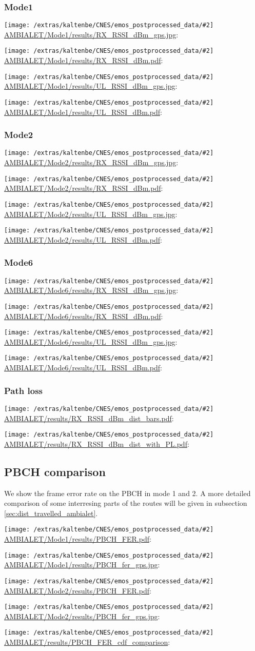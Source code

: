 \documentclass[a4paper,10pt]{article}
\newcommand{\printfile}[2][]{
 \begin{minipage}{8cm}
  \centering
  \texttt{[image: /extras/kaltenbe/CNES/emos\_postprocessed\_data/\#2]}
  \url{#2}: #1

 \end{minipage}
}
\begin{document}
\subsubsection{Mode1}
\printfile{AMBIALET/Mode1/results/RX_RSSI_dBm_gps.jpg}
\printfile{AMBIALET/Mode1/results/RX_RSSI_dBm.pdf}

\printfile{AMBIALET/Mode1/results/UL_RSSI_dBm_gps.jpg}
\printfile{AMBIALET/Mode1/results/UL_RSSI_dBm.pdf}

\subsubsection{Mode2}

\printfile{AMBIALET/Mode2/results/RX_RSSI_dBm_gps.jpg}
\printfile{AMBIALET/Mode2/results/RX_RSSI_dBm.pdf}

\printfile{AMBIALET/Mode2/results/UL_RSSI_dBm_gps.jpg}
\printfile{AMBIALET/Mode2/results/UL_RSSI_dBm.pdf}

\subsubsection{Mode6}
\printfile{AMBIALET/Mode6/results/RX_RSSI_dBm_gps.jpg}
\printfile{AMBIALET/Mode6/results/RX_RSSI_dBm.pdf}

\printfile{AMBIALET/Mode6/results/UL_RSSI_dBm_gps.jpg}
\printfile{AMBIALET/Mode6/results/UL_RSSI_dBm.pdf}

\subsubsection{Path loss}

\printfile{AMBIALET/results/RX_RSSI_dBm_dist_bars.pdf}
\printfile{AMBIALET/results/RX_RSSI_dBm_dist_with_PL.pdf}


\subsection{PBCH comparison}
We show the frame error rate on the PBCH in mode 1 and 2. A more detailed comparison of some interresing parts of the routes will be given in subsection \ref{sec:dist_travelled_ambialet}.

\printfile{AMBIALET/Mode1/results/PBCH_FER.pdf}
\printfile{AMBIALET/Mode1/results/PBCH_fer_gps.jpg}

\printfile{AMBIALET/Mode2/results/PBCH_FER.pdf}
\printfile{AMBIALET/Mode2/results/PBCH_fer_gps.jpg}

\printfile{AMBIALET/results/PBCH_FER_cdf_comparison}
\end{document}
